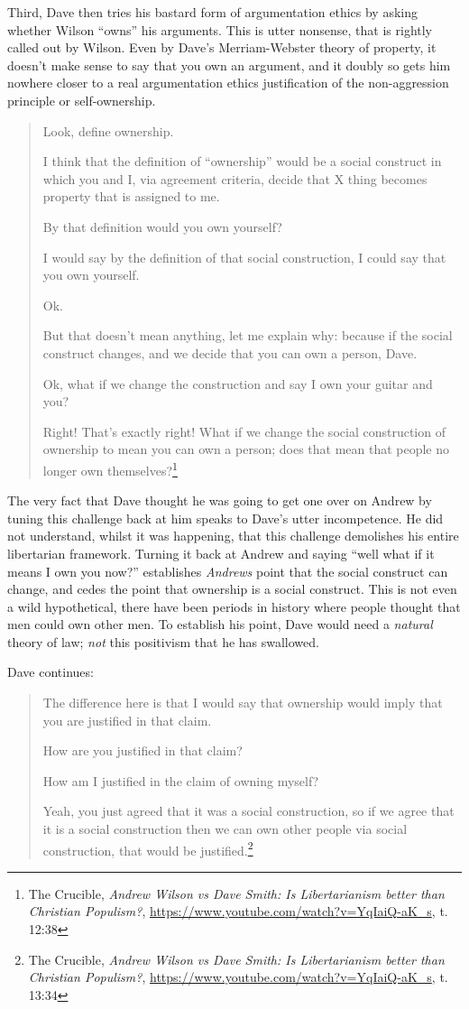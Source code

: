 \documentclass[11pt]{article}
\begin{document}
Third, Dave then tries his bastard form of argumentation ethics by asking whether Wilson ``owns'' his arguments. This is utter nonsense, that is rightly called out by Wilson. Even by Dave's Merriam-Webster theory of property, it doesn't make sense to say that you own an argument, and it doubly so gets him nowhere closer to a real argumentation ethics justification of the non-aggression principle or self-ownership.

\begin{quote}
Look, define ownership.

I think that the definition of ``ownership'' would be a social construct in which you and I, via agreement criteria, decide that X thing becomes property that is assigned to me.

By that definition would you own yourself?

I would say by the definition of that social construction, I could say that you own yourself.

Ok.

But that doesn't mean anything, let me explain why: because if the social construct changes, and we decide that you can own a person, Dave.

Ok, what if we change the construction and say I own your guitar and you?

Right! That's exactly right! What if we change the social construction of ownership to mean you can own a person; does that mean that people no longer own themselves?\footnote{The Crucible, \emph{Andrew Wilson vs Dave Smith: Is Libertarianism better than Christian Populism?}, \url{https://www.youtube.com/watch?v=YqIaiQ-aK\_s}, t. 12:38}
\end{quote}

The very fact that Dave thought he was going to get one over on Andrew by tuning this challenge back at him speaks to Dave's utter incompetence. He did not understand, whilst it was happening, that this challenge demolishes his entire libertarian framework. Turning it back at Andrew and saying ``well what if it means I own you now?'' establishes \emph{Andrews} point that the social construct can change, and cedes the point that ownership is a social construct. This is not even a wild hypothetical, there have been periods in history where people thought that men could own other men. To establish his point, Dave would need a \emph{natural} theory of law; \emph{not} this positivism that he has swallowed.

Dave continues:
\begin{quote}
The difference here is that I would say that ownership would imply that you are justified in that claim.

How are you justified in that claim?

How am I justified in the claim of owning myself?

Yeah, you just agreed that it was a social construction, so if we agree that it is a social construction then we can own other people via social construction, that would be justified.\footnote{The Crucible, \emph{Andrew Wilson vs Dave Smith: Is Libertarianism better than Christian Populism?}, \url{https://www.youtube.com/watch?v=YqIaiQ-aK\_s}, t. 13:34}
\end{quote}
\end{document}

